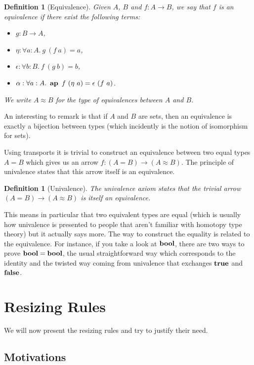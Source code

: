 \documentclass[11pt]{article}
\theoremstyle{plain}
\newtheorem{definition}[theorem]{Definition}
\theoremstyle{remark}
\begin{document}
\begin{definition}[Equivalence]
  Given $A$, $B$ and $f : A \to B$, we say that $f$ is an equivalence
  if there exist the following terms:
  \begin{itemize}
    \item $g : B \to A$,
    \item $\eta : \forall a:A.\ g\ (f\ a) = a$,
    \item $\epsilon : \forall b:B.\ f\ (g\ b) = b$,
    \item $\alpha : \forall a:A.\ \ap\ f\ (\eta\ a) = \epsilon\ (f\ a)$.
  \end{itemize}
  We write $A \approx B$ for the type of equivalences between $A$ and $B$.
\end{definition}

\noindent
An interesting to remark is that if $A$ and $B$ are sets, then an equivalence is
exactly a bijection between types (which incidently is the notion of isomorphism
for sets).

Using transports it is trivial to construct an equivalence between two equal
types $A = B$ which gives us an arrow $f : (A = B) \to (A \approx B)$.
The principle of univalence states that this arrow itself is an equivalence.

\begin{definition}[Univalence]
  The univalence axiom states that
  the trivial arrow $(A = B) \to (A \approx B)$ is itself an equivalence.
\end{definition}

\noindent
This means in particular that two equivalent types are equal (which is usually
how univalence is presented to people that aren't familiar with homotopy type
theory) but it actually says more. The way to construct the equality is related
to the equivalence.
For instance, if you take a look at $\operatorname{\mathbf{bool}}$, there are two ways to prove
$\operatorname{\mathbf{bool}} = \operatorname{\mathbf{bool}}$, the usual straightforward way which corresponds to the identity
and the twisted way coming from univalence that exchanges $\operatorname{\mathbf{true}}$ and $\operatorname{\mathbf{false}}$.

\section{Resizing Rules}

We will now present the resizing rules and try to justify their need.

\subsection{Motivations}
\end{document}
